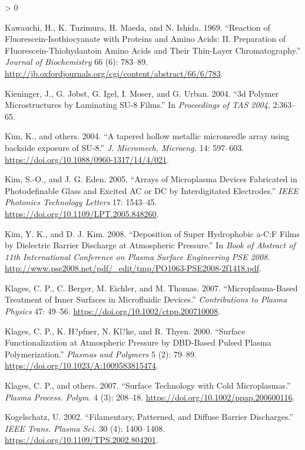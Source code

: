 \documentclass[
  10pt,
  twoside]{article}
\newlength{\cslhangindent}
\newenvironment{CSLReferences}[2] %
 {%
  \setlength{\parindent}{0pt}
  \ifodd #1 \everypar{\setlength{\hangindent}{\cslhangindent}}\ignorespaces\fi
  \ifnum #2 > 0
  \setlength{\parskip}{#2\baselineskip}
  \fi
 }%
 {}
\begin{document}
\begin{CSLReferences}{1}{0}
\leavevmode\hypertarget{ref-Kawa1969}{}%
Kawauchi, H., K. Tuzimura, H. Maeda, and N. Ishida. 1969. {``Reaction of Fluorescein-Isothiocyanate with Proteins and Amino Acids: {II.} Preparation of FIuorescein-Thiohydantoin Amino Acids and Their Thin-Layer Chromatography.''} \emph{Journal of Biochemistry} 66 (6): 783--89. \url{http://jb.oxfordjournals.org/cgi/content/abstract/66/6/783}.

\leavevmode\hypertarget{ref-Kien04}{}%
Kieninger, J., G. Jobst, G. Igel, I. Moser, and G. Urban. 2004. {``{3d} Polymer Microstructures by Laminating {SU-8} Films.''} In \emph{{Proceedings of {}TAS 2004}}, 2:363--65.

\leavevmode\hypertarget{ref-Kim04}{}%
Kim, K., and others. 2004. {``{A tapered hollow metallic microneedle array using backside exposure of SU-8}.''} \emph{J. Micromech. Microeng.} 14: 597--603. \url{https://doi.org/10.1088/0960-1317/14/4/021}.

\leavevmode\hypertarget{ref-Kim03}{}%
Kim, S.-O., and J. G. Eden. 2005. {``Arrays of Microplasma Devices Fabricated in Photodefinable Glass and Excited {AC or DC} by Interdigitated Electrodes.''} \emph{IEEE Photonics Technology Letters} 17: 1543--45. \url{https://doi.org/10.1109/LPT.2005.848260}.

\leavevmode\hypertarget{ref-Kim08}{}%
Kim, Y. K., and D. J. Kim. 2008. {``Deposition of Super Hydrophobic {a-C:F} Films by Dielectric Barrier Discharge at Atmospheric Pressure.''} In \emph{Book of Abstract of 11th International Conference on Plasma Surface Engineering PSE 2008}. \url{http://www.pse2008.net/pdf/_edit/tmp/PO1063-PSE2008-2f1418.pdf}.

\leavevmode\hypertarget{ref-Klag07-2}{}%
Klages, C. P., C. Berger, M. Eichler, and M. Thomas. 2007. {``Microplasma-Based Treatment of Inner Surfaces in Microfluidic Devices.''} \emph{Contributions to Plasma Physics} 47: 49--56. \url{https://doi.org/10.1002/ctpp.200710008}.

\leavevmode\hypertarget{ref-Klag00}{}%
Klages, C. P., K. H?pfner, N. Kl?ke, and R. Thyen. 2000. {``Surface Functionalization at Atmospheric Pressure by {DBD}-Based Pulsed Plasma Polymerization.''} \emph{Plasmas and Polymers} 5 (2): 79--89. \url{https://doi.org/10.1023/A:1009583815474}.

\leavevmode\hypertarget{ref-Klag07}{}%
Klages, C. P., and others. 2007. {``Surface Technology with Cold Microplasmas.''} \emph{Plasma Process. Polym.} 4 (3): 208--18. \url{https://doi.org/10.1002/ppap.200600116}.

\leavevmode\hypertarget{ref-Kogel02}{}%
Kogelschatz, U. 2002. {``Filamentary, Patterned, and Diffuse Barrier Discharges.''} \emph{IEEE Trans. Plasma Sci.} 30 (4): 1400--1408. \url{https://doi.org/10.1109/TPS.2002.804201}.


\end{CSLReferences}
\end{document}
